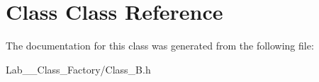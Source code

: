 \hypertarget{class_class}{\section{Class Class Reference}
\label{class_class}
}


The documentation for this class was generated from the following file\+:\begin{DoxyCompactItemize}
\item 
Lab\+\_\+\_\+\+Class\+\_\+\+Factory/Class\+\_\+\+B.\+h\end{DoxyCompactItemize}
